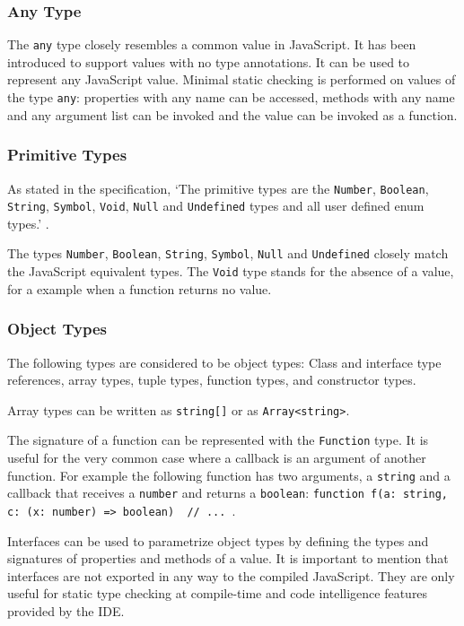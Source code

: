 \subsubsection{Any Type}
The \texttt{any} type closely resembles a common value in JavaScript. It has been introduced to support values with no type annotations. It can be used to represent any JavaScript value. Minimal static checking is performed on values of the type \texttt{any}: properties with any name can be accessed, methods with any name and any argument list can be invoked and the value can be invoked as a function.

\subsubsection{Primitive Types}
As stated in the specification, `The primitive types are the \texttt{Number}, \texttt{Boolean}, \texttt{String}, \texttt{Symbol}, \texttt{Void}, \texttt{Null} and \texttt{Undefined} types and all user defined enum types.' \citep{typescript}.

The types \texttt{Number}, \texttt{Boolean}, \texttt{String}, \texttt{Symbol}, \texttt{Null} and \texttt{Undefined} closely match the JavaScript equivalent types. The \texttt{Void} type stands for the absence of a value, for a example when a function returns no value.

\subsubsection{Object Types}
The following types are considered to be object types: Class and interface type references, array types, tuple types, function types, and constructor types.

Array types can be written as \texttt{string[]} or as \texttt{Array<string>}.

The signature of a function can be represented with the \texttt{Function} type. It is useful for the very common case where a callback is an argument of another function. For example the following function has two arguments, a \texttt{string} and a callback that receives a \texttt{number} and returns a \texttt{boolean}: \texttt{function f(a: string, c: (x: number) => boolean) { // ... }}.

Interfaces can be used to parametrize object types by defining the types and signatures of properties and methods of a value. It is important to mention that interfaces are not exported in any way to the compiled JavaScript. They are only useful for static type checking at compile-time and code intelligence features provided by the IDE.

